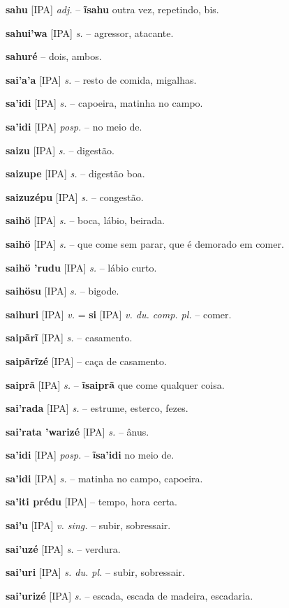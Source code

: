 \textbf{sahu} [IPA] \textit{adj.} -- \textbf{ĩsahu} outra vez, repetindo, bis.

\textbf{sahui'wa} [IPA] \textit{s.} -- agressor, atacante.

\textbf{sahuré} -- dois, ambos.

\textbf{sai'a'a} [IPA] \textit{s.} -- resto de comida, migalhas.

\textbf{sa'idi} [IPA] \textit{s.} -- capoeira, matinha no campo.

\textbf{sa'idi} [IPA] \textit{posp.} -- no meio de.

\textbf{saizu} [IPA] \textit{s.} -- digestão.

\textbf{saizupe} [IPA] \textit{s.} -- digestão boa.

\textbf{saizuzépu} [IPA] \textit{s.} -- congestão.

\textbf{saihö} [IPA] \textit{s.} -- boca, lábio, beirada.

\textbf{saihö} [IPA] \textit{s.} -- que come sem parar, que é demorado em comer.

\textbf{saihö 'rudu} [IPA] \textit{s.} -- lábio curto.

\textbf{saihösu} [IPA] \textit{s.} -- bigode.

\textbf{saihuri} [IPA] \textit{v.} = \textbf{si} [IPA] \textit{v. du. comp. pl.} -- comer.

\textbf{saipãrĩ} [IPA] \textit{s.} -- casamento.

\textbf{saipãrĩzé} [IPA] \textit{} -- caça de casamento.

\textbf{saiprã} [IPA] \textit{s.} -- \textbf{ĩsaiprã} que come qualquer coisa.

\textbf{sai'rada} [IPA] \textit{s.} -- estrume, esterco, fezes.

\textbf{sai'rata 'warizé} [IPA] \textit{s.} -- ânus.

\textbf{sa'idi} [IPA] \textit{posp.} -- \textbf{ĩsa'idi} no meio de.

\textbf{sa'idi} [IPA] \textit{s.} -- matinha no campo, capoeira.

\textbf{sa'iti prédu} [IPA] \textit{} -- tempo, hora certa.

\textbf{sai'u} [IPA] \textit{v. sing.} -- subir, sobressair.

\textbf{sai'uzé} [IPA] \textit{s.} -- verdura.

\textbf{sai'uri} [IPA] \textit{s. du. pl.} -- subir, sobressair.

\textbf{sai'urizé} [IPA] \textit{s.} -- escada, escada de madeira, escadaria.


